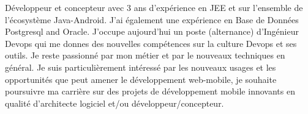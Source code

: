 %
%
%
\par{
Développeur et concepteur avec 3 ans d'expérience en JEE et sur l'ensemble de l'écosystème Java-Android. J'ai également une expérience en Base de Données Postgresql and Oracle. J'occupe aujourd'hui un poste (alternance) d'Ingénieur Devops qui me donnes des nouvelles compétences sur la culture Devops et ses outils. Je reste passionné par mon métier et par le nouveaux techniques en général. Je suis particulièrement intéressé par les nouveaux usages et les opportunités que peut amener le développement web-mobile, je souhaite poursuivre ma carrière sur des projets de développement mobile innovants en qualité d'architecte logiciel et/ou développeur/concepteur.
}
